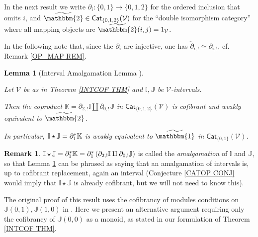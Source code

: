 \documentclass[a4paper,10pt
,draft
]{article}%
\numberwithin{equation}{section}
\numberwithin{figure}{section}
\newtheorem{lemma}[equation]{Lemma}%
\theoremstyle{definition} %
\newtheorem{remark}[equation]{Remark}%
\newcommand{\V}{\ensuremath{\mathcal V}}
\newcommand{\1}{\ensuremath{\mathbbm 1}}%
\begin{document}
In the next result we write 
$\partial_i \colon \{0,1\} \to \{0,1,2\}$
for the ordered inclusion that omits $i$,
and  
$\widetilde{\mathbbm{2}} \in
\mathsf{Cat}_{\{0,1,2\}}(\V)$
for the ``double isomorphism category''
where all mapping objects are $\widetilde{\mathbbm{2}}(i,j)=1_{\V}$.


In the following note that, since the $\partial_i$
are injective, one has 
$\check{\partial}_{i,!} \simeq \partial_{i,!}$,
cf. Remark \ref{OP_MAP REM}.

\begin{lemma}[Interval Amalgamation Lemma {\cite[Lemma 1.16]{BM13}}]
\label{AMALGLEM LEM}

Let $\V$ be as in Theorem \ref{INTCOF THM} and
$\mathbb{I},\mathbb{J}$ be $\V$-intervals.

Then the coproduct 
$\mathbb{K} = \partial_{2,!} \mathbb{I} \amalg \partial_{0,!} \mathbb{J}$
in $\mathsf{Cat}_{\{0,1,2\}}(\V)$
is cofibrant and weakly equivalent to $\widetilde{\mathbbm{2}}$.

In particular, 
$\mathbb{I} \star \mathbb{J} = \partial_1^{\**}\mathbb{K}$
is weakly equivalent to $\widetilde{\mathbbm{1}}$
in $\mathsf{Cat}_{\{0,1\}}(\V)$.
\end{lemma}


\begin{remark}
$\mathbb{I} \star \mathbb{J} = 
\partial_1^{\**} \mathbb{K} =
\partial_1^{\**} \left(\partial_{2,!} \mathbb{I} \amalg \partial_{0,!} \mathbb{J}\right)$
is called the \emph{amalgamation} of $\mathbb{I}$ and $\mathbb{J}$,
so that Lemma \ref{AMALGLEM LEM} can be phrased as saying that an amalgamation of intervals is,
up to cofibrant replacement, again an interval
(Conjecture \ref{CATOP CONJ} would imply that $\mathbb{I} \star \mathbb{J}$ is already cofibrant, 
but we will not need to know this).
\end{remark}


The original proof of this result \cite[Lemma 1.16]{BM13} uses the cofibrancy of modules conditions on
$\mathbb{J}(0,1),\mathbb{J}(1,0)$
in \cite[Thm 1.15]{BM13}.
Here we present an alternative argument requiring only the cofibrancy of $\mathbb{J}(0,0)$ as a monoid,
as stated in our formulation of Theorem \ref{INTCOF THM}.
\end{document}
